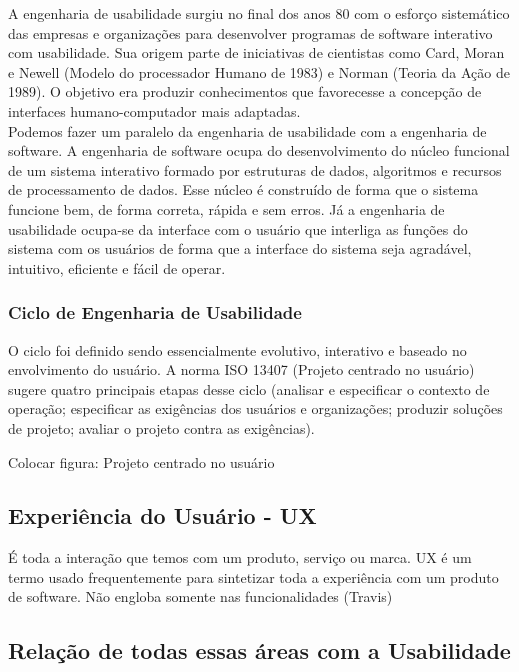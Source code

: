 A engenharia de usabilidade surgiu no final dos anos 80 com o esforço sistemático das empresas e organizações para desenvolver programas de software interativo com usabilidade. Sua origem parte de iniciativas de cientistas como Card, Moran e Newell (Modelo do processador Humano de 1983) e Norman (Teoria da Ação de 1989). O objetivo era produzir conhecimentos que favorecesse a concepção de interfaces humano-computador mais adaptadas. ~\cite{cybis2010ergonomia}
\\
Podemos fazer um paralelo da engenharia de usabilidade com a engenharia de software. A engenharia de software ocupa do desenvolvimento do núcleo funcional de um sistema interativo formado por estruturas de dados, algoritmos e recursos de processamento de dados. Esse núcleo é construído de forma que o sistema funcione bem, de forma correta, rápida e sem erros. Já a engenharia de usabilidade ocupa-se da interface com o usuário que interliga as funções do sistema com os usuários de forma que a interface do sistema seja agradável, intuitivo, eficiente e fácil de operar.~\cite{cybis2010ergonomia}

\subsubsection{Ciclo de Engenharia de Usabilidade}

	O ciclo foi definido sendo essencialmente evolutivo, interativo e baseado no envolvimento do usuário. A norma ISO 13407 (Projeto centrado no usuário) sugere quatro principais etapas desse ciclo (analisar e especificar o contexto de operação; especificar as exigências dos usuários e organizações; produzir soluções de projeto; avaliar o projeto contra as exigências). ~\cite{cybis2010ergonomia}

Colocar figura: Projeto centrado no usuário

\subsection{Experiência do Usuário - UX}
É toda a interação que temos com um produto, serviço ou marca.
UX é um termo usado frequentemente para sintetizar toda a experiência com um produto de software. Não engloba  somente nas funcionalidades (Travis)


\subsection{Relação de todas essas áreas com a Usabilidade}

